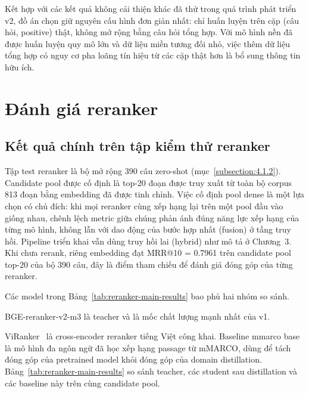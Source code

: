 \documentclass[../DoAn.tex]{subfiles}
\begin{document}
Kết hợp với các kết quả không cải thiện khác đã thử trong quá trình phát triển v2, đồ án chọn giữ nguyên cấu hình đơn giản nhất: chỉ huấn luyện trên cặp (câu hỏi, positive) thật, không mở rộng bằng câu hỏi tổng hợp. Với mô hình nền đã được huấn luyện quy mô lớn và dữ liệu miền tương đối nhỏ, việc thêm dữ liệu tổng hợp có nguy cơ pha loãng tín hiệu từ các cặp thật hơn là bổ sung thông tin hữu ích.

\section{Đánh giá reranker}
\label{section:4.2}

\subsection{Kết quả chính trên tập kiểm thử reranker}
\label{subsection:4.2.1}

Tập test reranker là bộ mở rộng 390 câu zero-shot (mục~\ref{subsection:4.1.2}). Candidate pool được cố định là top-20 đoạn được truy xuất từ toàn bộ corpus 813 đoạn bằng embedding đã được tinh chỉnh. Việc cố định pool dense là một lựa chọn có chủ đích: khi mọi reranker cùng xếp hạng lại trên một pool đầu vào giống nhau, chênh lệch metric giữa chúng phản ánh đúng năng lực xếp hạng của từng mô hình, không lẫn với dao động của bước hợp nhất (fusion) ở tầng truy hồi. Pipeline triển khai vẫn dùng truy hồi lai (hybrid) như mô tả ở Chương~3. Khi chưa rerank, riêng embedding đạt MRR@10 = 0.7961 trên candidate pool top-20 của bộ 390 câu, đây là điểm tham chiếu để đánh giá đóng góp của từng reranker.

Các model trong Bảng~\ref{tab:reranker-main-results} bao phủ hai nhóm so sánh.

BGE-reranker-v2-m3 là teacher và là mốc chất lượng mạnh nhất của v1.

ViRanker~\cite{viranker} là cross-encoder reranker tiếng Việt công khai. Baseline mmarco base là mô hình đa ngôn ngữ đã học xếp hạng passage từ mMARCO, dùng để tách đóng góp của pretrained model khỏi đóng góp của domain distillation. Bảng~\ref{tab:reranker-main-results} so sánh teacher, các student sau distillation và các baseline này trên cùng candidate pool.
\end{document}

